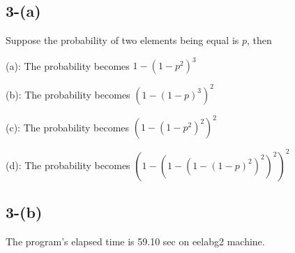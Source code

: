 \documentclass{article}
\begin{document}
\subsection*{3-(a)}
Suppose the probability of two elements being equal is \(p\), then \newline


\noindent (a): The probability becomes \(1-(1-p^2)^3\)

\noindent (b): The probability becomes \((1-(1-p)^3)^2\)

\noindent (c): The probability becomes \((1-(1-p^2)^2)^2\)

\noindent (d): The probability becomes \( (1-(1-(1-(1-p)^2)^2)^2)^2 \)

\subsection*{3-(b)}
The program's elapsed time is 59.10 sec on eelabg2 machine.
\end{document}
